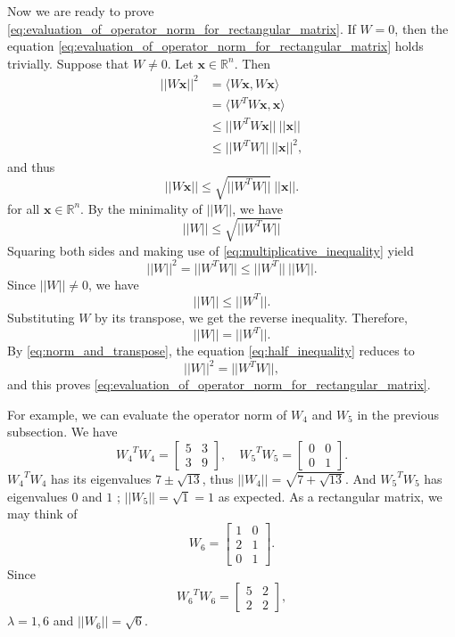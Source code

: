 \documentclass[12pt]{report}
\numberwithin{figure}{chapter}
\theoremstyle{plain}
\theoremstyle{definition}
\theoremstyle{corollary}
\theoremstyle{definition}
\theoremstyle{plain}
\theoremstyle{definition}
\theoremstyle{plain}
\newcommand\bx{\ensuremath{\boldsymbol x}}
\begin{document}
Now we are ready to prove \eqref{eq:evaluation_of_operator_norm_for_rectangular_matrix}.
If \(W=0\), then the equation \eqref{eq:evaluation_of_operator_norm_for_rectangular_matrix} holds trivially.
Suppose that \(W\neq0\).
Let \(\bx\in\mathbb R^n\).
Then
\begin{align*}
||W\bx||^2
&=\langle W\bx,W\bx\rangle\\
&=\langle W^TW\bx,\bx\rangle\\
&\le||W^TW\bx||\:||\bx||\\
&\le||W^TW||\:||\bx||^2,
\end{align*}
and thus
\[||W\bx||\le\sqrt{||W^TW||}\:||\bx||.\]
for all \(\bx\in\mathbb R^n\).
By the minimality of \(||W||\), we have
\[||W||\le\sqrt{||W^TW||}\]
Squaring both sides and making use of \eqref{eq:multiplicative_inequality} yield
\begin{equation}\label{eq:half_inequality}
||W||^2=||W^TW||\le||W^T||\:||W||.
\end{equation}
Since \(||W||\neq0\), we have
\[||W||\le||W^T||.\]
Substituting \(W\) by its transpose, we get the reverse inequality.
Therefore,
\begin{equation}\label{eq:norm_and_transpose}
||W||=||W^T||.
\end{equation}
By \eqref{eq:norm_and_transpose}, the equation \eqref{eq:half_inequality} reduces to
\[||W||^2=||W^TW||,\]
and this proves \eqref{eq:evaluation_of_operator_norm_for_rectangular_matrix}.

For example, we can evaluate the operator norm of \(W_4\) and \(W_5\) in the previous subsection.
We have
\[{W_4}^TW_4=\begin{bmatrix}5&3\\3&9\end{bmatrix},\quad{W_5}^TW_5=\begin{bmatrix}0&0\\0&1\end{bmatrix}.\]
\({W_4}^TW_4\) has its eigenvalues \(7\pm\sqrt{13}\), thus \(||W_4||=\sqrt{7+\sqrt{13}}\).
And \({W_5}^TW_5\) has eigenvalues \(0\) and \(1\) ; \(||W_5||=\sqrt1=1\) as expected.
As a rectangular matrix, we may think of
\[W_6=\begin{bmatrix}1&0\\2&1\\0&1\end{bmatrix}.\]
Since
\[{W_6}^TW_6=\begin{bmatrix}5&2\\2&2\end{bmatrix},\]
\(\lambda=1,6\) and \(||W_6||=\sqrt6\).
\end{document}

